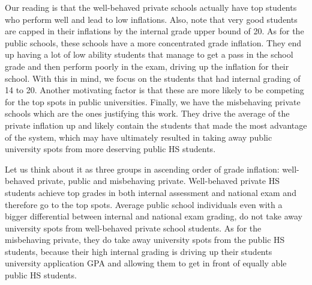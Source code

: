 \documentclass{article}
\begin{document}
Our reading is that the well-behaved private schools actually have top students who perform well and lead to low inflations. Also, note that very good students are capped in their inflations by the internal grade upper bound of 20. As for the public schools, these schools have a more concentrated grade inflation. They end up having a lot of low ability students that manage to get a pass in the school grade and then perform poorly in the exam, driving up the inflation for their school. With this in mind, we focus on the students that had internal grading of 14 to 20. Another motivating factor is that these are more likely to be competing for the top spots in public universities.
Finally, we have the misbehaving private schools which are the ones justifying this work. They drive the average of the private inflation up and likely contain the students that made the most advantage of the system, which may have ultimately resulted in taking away public university spots from more deserving public HS students.

Let us think about it as three groups in ascending order of grade inflation: well-behaved private, public and misbehaving private. Well-behaved private HS students achieve top grades in both internal assessment and national exam and therefore go to the top spots. Average public school individuals even with a bigger differential between internal and national exam grading, do not take away university spots from well-behaved private school students. As for the misbehaving private, they do take away university spots from the public HS students, because their high internal grading is driving up their students university application GPA and allowing them to get in front of equally able public HS students.






\newpage
%


\end{document}
